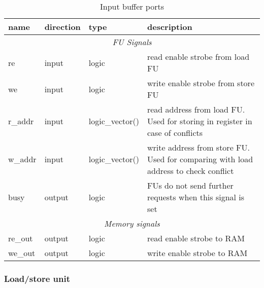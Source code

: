 	\begin{table}[htbp]
		\begin{tabular}{| l| l | l | p{7cm} |}
			\hline
			\textbf{name} & \textbf{direction} & \textbf{type} &  \textbf{description}\\ \hline
			\multicolumn{4}{|c|}{\textit{FU Signals}} \\ \hline
			re & input & logic & read enable strobe from load FU \\ \hline
			we & input & logic & write enable strobe from store FU \\ \hline
			r\_addr & input & logic\_vector(\bankAddrL) & read address from load FU. Used for storing in register in case of conflicts  \\ \hline
			w\_addr & input & logic\_vector(\bankAddrL) & write address from store FU. Used for comparing with load address to check conflict  \\ \hline
			busy & output & logic & FUs do not send further requests when this signal is set \\ \hline
			\multicolumn{4}{|c|}{\textit{Memory signals}} \\ \hline
			re\_out & output & logic & read enable strobe to RAM \\ \hline
			we\_out & output & logic & write enable strobe to RAM \\ \hline
		\end{tabular}
		
		\caption{Input buffer ports \label{table:bc_description}}
		\centering
	\end{table}
	
	\FloatBarrier
	\subsubsection{Load/store unit}
	
